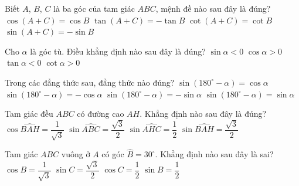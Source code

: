 \begin{ex}%
	Biết $A$, $B$, $C$ là ba góc của tam giác $ABC$, mệnh đề nào sau đây là đúng?
	\choice
	{$\cos \left(A+C\right)=\cos B$}
	{\True $\tan \left(A+C\right)=-\tan B$}
	{$\cot \left(A+C\right)=\cot B$}
	{$\sin \left(A+C\right)=-\sin B$}
\end{ex}
\begin{ex}%
	Cho $\alpha$ là góc tù. Điều khẳng định nào sau đây là đúng?
	\choice
	{$\sin \alpha < 0$}
	{$\cos \alpha > 0$}
	{\True $\tan \alpha < 0$}
	{$\cot \alpha > 0$}
\end{ex}
\begin{ex}%
	Trong các đẳng thức sau, đẳng thức nào đúng?
	\choice
	{$\sin \left(180^{\circ}-\alpha \right)=\cos \alpha$}
	{$\sin \left(180^{\circ}-\alpha \right)=-\cos \alpha$}
	{$\sin \left(180^{\circ}-\alpha \right)=-\sin \alpha$}
	{\True $\sin \left(180^{\circ}-\alpha \right)=\sin \alpha$}
\end{ex}
\begin{ex}%
	Tam giác đều $ABC$ có đường cao $AH$. Khẳng định nào sau đây là đúng?
	\choice
	{$\cos \widehat{BAH}=\dfrac{1}
			{\sqrt{3}}$}
	{\True $\sin \widehat{ABC}=\dfrac{\sqrt{3}}
			{2}$}
	{$\sin \widehat{AHC}=\dfrac{1}{2}$}
	{$\sin \widehat{BAH}=\dfrac{\sqrt{3}}{2}$}
\end{ex}
\begin{ex}%
	Tam giác $ABC$ vuông ở $A$ có góc $\widehat{B}=30^{\circ}$. Khẳng định nào sau đây là sai?
	\choice
	{\True $\cos B=\dfrac{1}
			{\sqrt{3}}$}
	{$\sin C=\dfrac{\sqrt{3}}
			{2}$}
	{$\cos C=\dfrac{1}{2}$}
	{$\sin B=\dfrac{1}{2}$}
\end{ex}
